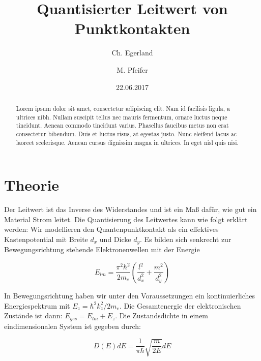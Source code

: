 \documentclass[aps,twocolumn,secnumarabic,nobalancelastpage,amsmath,amssymb,
nofootinbib,superscriptaddress]{revtex4-1}
\begin{document}
\title{Quantisierter Leitwert von Punktkontakten}
\author         {Ch. Egerland}
\author         {M. Pfeifer}
\date[Versuchsdatum: ]{22.06.2017}

\begin{abstract}
Lorem ipsum dolor sit amet, consectetur adipiscing elit. Nam id facilisis ligula,
a ultrices nibh. Nullam suscipit tellus nec mauris fermentum, ornare luctus neque
tincidunt. Aenean commodo tincidunt varius. Phasellus faucibus metus non erat
consectetur bibendum. Duis et luctus risus, at egestas justo. Nunc eleifend lacus
ac laoreet scelerisque. Aenean cursus dignissim magna in ultrices. In eget nisl
quis nisi.
\end{abstract}


\maketitle




\section{Theorie}

Der Leitwert ist das Inverse des Widerstandes und ist ein Maß dafür, wie gut ein
Material Strom leitet. Die Quantisierung des Leitwertes kann wie folgt erklärt
werden: Wir modellieren den Quantenpunktkontakt als ein effektives Kastenpotential
mit Breite $d_x$ und Dicke $d_y$. Es bilden sich senkrecht zur Bewegungsrichtung
stehende Elektronenwellen mit der Energie

  \begin{equation}
    E_{lm} = \frac{\pi^2 \hbar^2}{2 m_e} \left(\frac{l^2}{d_x^2}+\frac{m^2}{d_y^2} \right)
  \end{equation}

In Bewegungsrichtung haben wir unter den Voraussetzungen ein kontinuierliches
Energiespektrum mit $E_z = \hbar^2 k_z^2 / 2m_e$. Die Gesamtenergie der elektronischen
Zustände ist dann: $E_{ges} = E_{lm} + E_z$.
Die Zustandsdichte in einem eindimensionalen System ist gegeben durch:

  \begin{equation}
    D(E) dE = \frac{1}{\pi \hbar} \sqrt{\frac{m}{2 E}}dE
  \end{equation}
\end{document}
